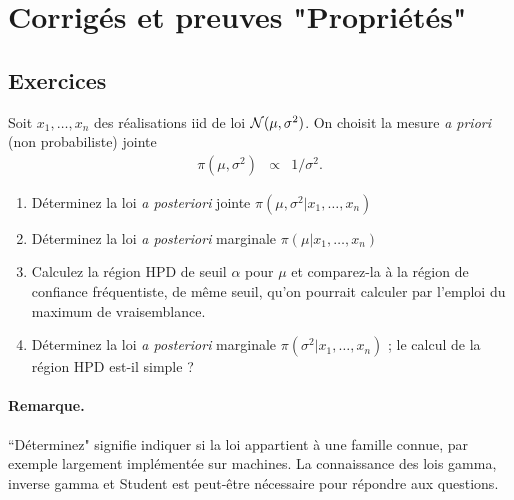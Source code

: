 \documentclass[10pt]{article}
\begin{document}
 




\clearpage
\section{Corrigés et preuves "Propriétés"}


\subsection{Exercices}

\if{} 
\begin{exec}
Soit $x_1,\ldots,x_n$ des réalisations iid de loi ${\cal{N}}(\mu,\sigma^2)$. On choisit la mesure {\it a priori} (non probabiliste) jointe
\begin{eqnarray*}
\pi(\mu,\sigma^2) & \propto & 1/\sigma^2.
\end{eqnarray*}
\begin{enumerate}
\item Déterminez la loi {\it a posteriori} jointe $\pi(\mu,\sigma^2|x_1,\ldots,x_n)$ 
\item Déterminez la loi {\it a posteriori} marginale $\pi(\mu|x_1,\ldots,x_n)$ 
\item Calculez la région HPD de seuil $\alpha$ pour $\mu$ et comparez-la à la région de confiance fréquentiste, de même seuil, qu'on pourrait calculer par l'emploi du maximum de vraisemblance.
\item Déterminez la loi {\it a posteriori} marginale $\pi(\sigma^2|x_1,\ldots,x_n)$ ; le calcul de la région HPD est-il simple ?
\end{enumerate}
\paragraph{Remarque.} ``Déterminez" signifie indiquer si la loi appartient à une famille connue, par exemple largement implémentée sur machines. La connaissance des lois gamma, inverse gamma et Student est peut-être nécessaire pour répondre aux questions.
\end{exec}


\fi
\end{document}
